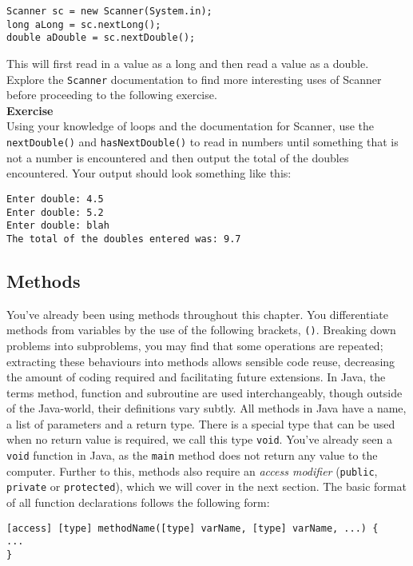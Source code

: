 \begin{verbatim}
Scanner sc = new Scanner(System.in);
long aLong = sc.nextLong();
double aDouble = sc.nextDouble();
\end{verbatim}

\noindent
This will first read in a value as a long and then read a value as a double. Explore the {\tt Scanner} documentation to find more interesting uses of Scanner before proceeding to the following exercise.\\

\noindent
{\bf Exercise}\\

\noindent
Using your knowledge of loops and the documentation for Scanner, use the {\tt nextDouble()} and {\tt hasNextDouble()} to read in numbers until something that is not a number is encountered and then output the total of the doubles encountered. Your output should look something like this:

\begin{verbatim}
Enter double: 4.5
Enter double: 5.2
Enter double: blah
The total of the doubles entered was: 9.7
\end{verbatim}

\subsection{Methods}

You've already been using methods throughout this chapter. You differentiate methods from variables by the use of the following brackets, {\tt ()}. Breaking down problems into subproblems, you may find that some operations are repeated; extracting these behaviours into methods allows sensible code reuse, decreasing the amount of coding required and facilitating future extensions. In Java, the terms method, function and subroutine are used interchangeably, though outside of the Java-world, their definitions vary subtly. All methods in Java have a name, a list of parameters and a return type. There is a special type that can be used when no return value is required, we call this type {\tt void}. You've already seen a {\tt void} function in Java, as the {\tt main} method does not return any value to the computer. Further to this, methods also require an \emph{access modifier} ({\tt public}, {\tt private} or {\tt protected}), which we will cover in the next section. The basic format of all function declarations follows the following form:

\begin{verbatim}
[access] [type] methodName([type] varName, [type] varName, ...) {
...
}
\end{verbatim}

